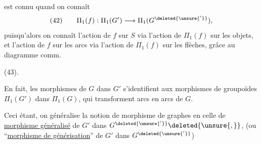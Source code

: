 est connu quand on connaît
\[
(42)\qquad\Pi_1(f):\Pi_1(G')\longrightarrow\Pi_1(G^{\deleted{\unsure{'}}}),
\]
puisqu'alors on connaît l'action de $f$ sur $S$ via l'action de $\Pi_1(f)$ sur les objets, et l'action de $f$ sur les arcs via l'action de $\Pi_1(f)$ sur les flèches, grâce au diagramme comm.

(43)\quad{}.

En fait, les morphismes de $G$ dans $G'$ s'identifient aux morphismes de groupoïdes $\Pi_1(G')$ dans $\Pi_1(G)$, qui transforment arcs  en arcs de $G$.

Ceci étant, on généralise la notion de morphisme de graphes en celle de \uline{morphisme généralisé} de $G'$ dans $G^{\deleted{\unsure{'}}}\deleted{\unsure{,}}$, (ou ``\uline{morphisme de générisation}'' de $G'$ dans $G^{\deleted{\unsure{'}}}$)
